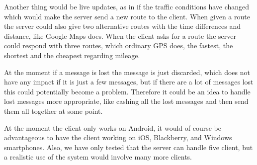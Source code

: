 Another thing would be live updates, as in if the traffic conditions have changed which would make the server send a new route to the client. When given a route the server could also give two alternative routes with the time differences and distance, like Google Maps does.
When the client asks for a route the server could respond with three routes, which ordinary GPS does, the fastest, the shortest and the cheapest regarding  mileage.

At the moment if a message is lost the message is just discarded, which does not have any impact if it is just a few messages, but if there are a lot of messages lost this could potentially become a problem. Therefore it could be an idea to handle lost messages more appropriate, like cashing all the lost messages and then send them all together at some point.

At the moment the client only works on Android, it would of course be advantageous to have the client working on iOS, Blackberry, and Windows smartphones. Also, we have only tested that the server can handle five client, but a realistic use of the system would involve many more clients.